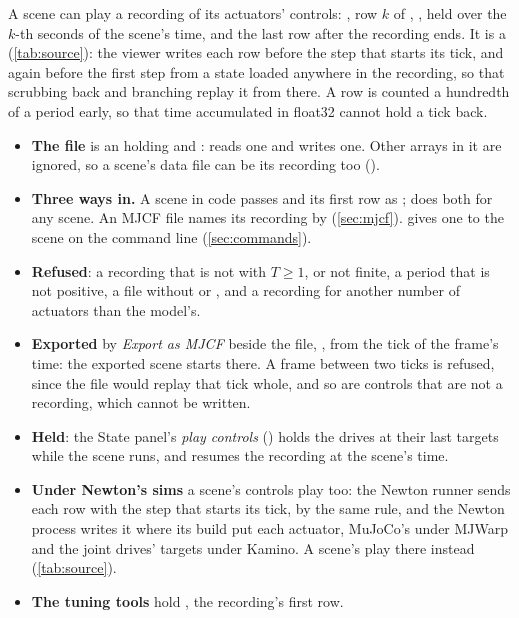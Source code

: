 A scene can play a recording of its actuators' controls: , row $k$ of , , held over the $k$-th  seconds of the scene's time, and the last row after the recording ends. It is a  (\cref{tab:source}): the viewer writes each row before the step that starts its tick, and again before the first step from a state loaded anywhere in the recording, so that scrubbing back and branching replay it from there. A row is counted a hundredth of a period early, so that time accumulated in float32 cannot hold a tick back.
\begin{itemize}
\item \textbf{The file} is an  holding  and :  reads one and  writes one. Other arrays in it are ignored, so a scene's data file can be its recording too ().
\item \textbf{Three ways in.} A scene in code passes  and its first row as ;  does both for any scene. An MJCF file names its recording by  (\cref{sec:mjcf}).  gives one to the scene on the command line (\cref{sec:commands}).
\item \textbf{Refused}: a recording that is not  with $T \geq 1$, or not finite, a period that is not positive, a file without  or , and a recording for another number of actuators than the model's.
\item \textbf{Exported} by \emph{Export as MJCF} beside the file, , from the tick of the frame's time: the exported scene starts there. A frame between two ticks is refused, since the file would replay that tick whole, and so are controls that are not a recording, which cannot be written.
\item \textbf{Held}: the State panel's \emph{play controls} () holds the drives at their last targets while the scene runs, and resumes the recording at the scene's time.
\item \textbf{Under Newton's sims} a scene's controls play too: the Newton runner sends each row with the step that starts its tick, by the same rule, and the Newton process writes it where its build put each actuator, MuJoCo's  under MJWarp and the joint drives' targets under Kamino. A scene's  play there instead (\cref{tab:source}).
\item \textbf{The tuning tools} hold , the recording's first row.
\end{itemize}

